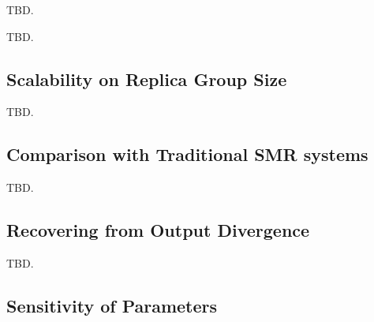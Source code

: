 TBD.

TBD.

\subsection{Scalability on Replica Group Size} \label{sec:scalability}

TBD.

\subsection{Comparison with Traditional SMR systems} \label{sec:compare}

TBD.

\subsection{Recovering from Output Divergence} \label{sec:robust}

TBD.

\subsection{Sensitivity of Parameters} \label{sec:sensitivity}



 


